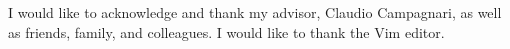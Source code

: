 \begin{acknowledgements}

I would like to acknowledge and thank my advisor, Claudio Campagnari, as well as friends, family, and colleagues.
I would like to thank the Vim editor.

\end{acknowledgements} 
